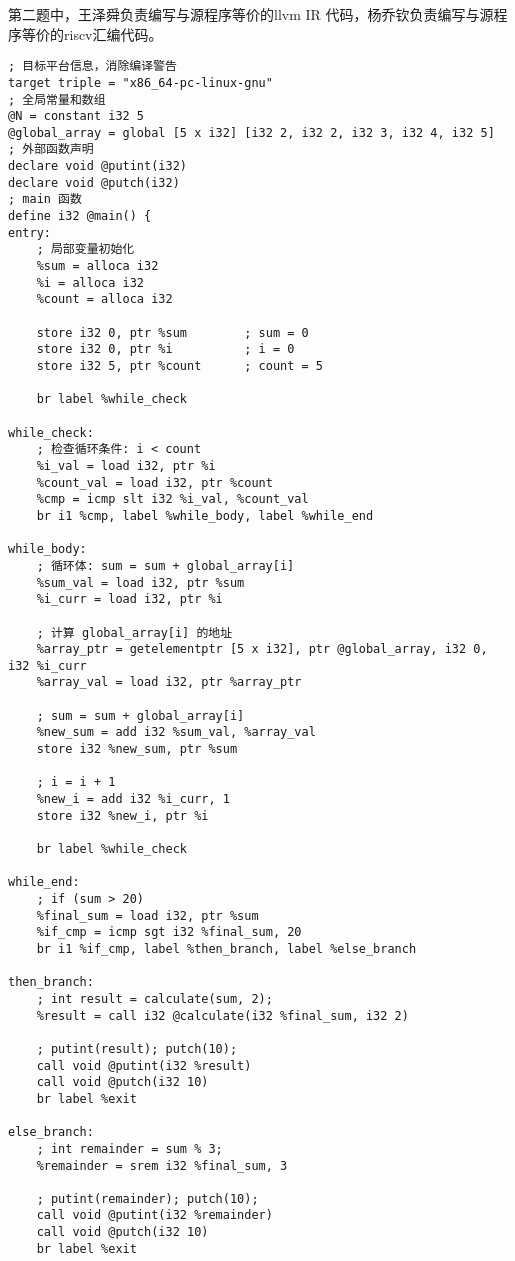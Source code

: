 \documentclass[a4paper]{article}
\begin{document}
第二题中，王泽舜负责编写与源程序等价的llvm IR 代码，杨乔钦负责编写与源程序等价的riscv汇编代码。
\begin{lstlisting}[language=text,caption={test\_new.ll}]
; 目标平台信息，消除编译警告
target triple = "x86_64-pc-linux-gnu"
; 全局常量和数组
@N = constant i32 5
@global_array = global [5 x i32] [i32 2, i32 2, i32 3, i32 4, i32 5]
; 外部函数声明
declare void @putint(i32)
declare void @putch(i32)
; main 函数
define i32 @main() {
entry:
    ; 局部变量初始化
    %sum = alloca i32
    %i = alloca i32
    %count = alloca i32
    
    store i32 0, ptr %sum        ; sum = 0
    store i32 0, ptr %i          ; i = 0
    store i32 5, ptr %count      ; count = 5
    
    br label %while_check

while_check:
    ; 检查循环条件: i < count
    %i_val = load i32, ptr %i
    %count_val = load i32, ptr %count
    %cmp = icmp slt i32 %i_val, %count_val
    br i1 %cmp, label %while_body, label %while_end

while_body:
    ; 循环体: sum = sum + global_array[i]
    %sum_val = load i32, ptr %sum
    %i_curr = load i32, ptr %i
    
    ; 计算 global_array[i] 的地址
    %array_ptr = getelementptr [5 x i32], ptr @global_array, i32 0, i32 %i_curr
    %array_val = load i32, ptr %array_ptr
    
    ; sum = sum + global_array[i]
    %new_sum = add i32 %sum_val, %array_val
    store i32 %new_sum, ptr %sum
    
    ; i = i + 1
    %new_i = add i32 %i_curr, 1
    store i32 %new_i, ptr %i
    
    br label %while_check

while_end:
    ; if (sum > 20)
    %final_sum = load i32, ptr %sum
    %if_cmp = icmp sgt i32 %final_sum, 20
    br i1 %if_cmp, label %then_branch, label %else_branch

then_branch:
    ; int result = calculate(sum, 2);
    %result = call i32 @calculate(i32 %final_sum, i32 2)
    
    ; putint(result); putch(10);
    call void @putint(i32 %result)
    call void @putch(i32 10)
    br label %exit

else_branch:
    ; int remainder = sum % 3;
    %remainder = srem i32 %final_sum, 3
    
    ; putint(remainder); putch(10);
    call void @putint(i32 %remainder)
    call void @putch(i32 10)
    br label %exit


\end{lstlisting}
\end{document}
